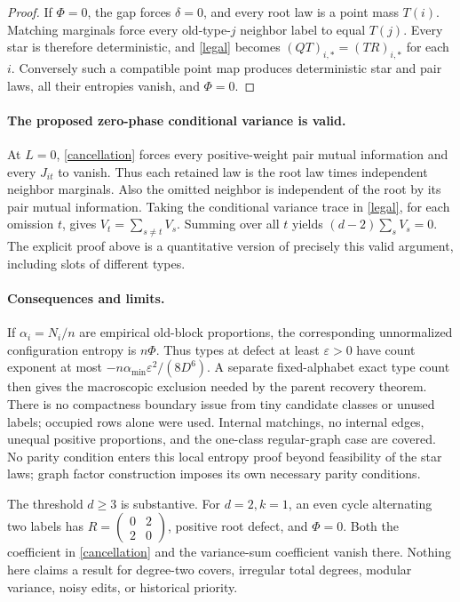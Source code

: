 \documentclass[11pt]{article}
\begin{document}
\begin{proof}
If $\Phi=0$, the gap forces $\delta=0$, and every root law is a point
mass $T(i)$. Matching marginals force every old-type-$j$ neighbor label
to equal $T(j)$. Every star is therefore deterministic, and
\eqref{legal} becomes $(QT)_{i,*}=(TR)_{i,*}$ for each $i$.
Conversely such a compatible point map produces deterministic star and
pair laws, all their entropies vanish, and $\Phi=0$.
\end{proof}

\paragraph{The proposed zero-phase conditional variance is valid.}
At $L=0$, \eqref{cancellation} forces every positive-weight pair mutual
information and every $J_{it}$ to vanish. Thus each retained law is the
root law times independent neighbor marginals. Also the omitted neighbor
is independent of the root by its pair mutual information. Taking the
conditional variance trace in \eqref{legal}, for each omission $t$,
gives $V_t=\sum_{s\ne t}V_s$. Summing over all $t$ yields
$(d-2)\sum_sV_s=0$. The explicit proof above is a quantitative version
of precisely this valid argument, including slots of different types.

\paragraph{Consequences and limits.}
If $\alpha_i=N_i/n$ are empirical old-block proportions, the corresponding
unnormalized configuration entropy is $n\Phi$. Thus types at defect at
least $\varepsilon>0$ have count exponent at most
$-n\alpha_{\min}\varepsilon^2/(8D^6)$. A separate fixed-alphabet exact
type count then gives the macroscopic exclusion needed by the parent
recovery theorem. There is no compactness boundary issue from tiny
candidate classes or unused labels; occupied rows alone were used.
Internal matchings, no internal edges, unequal positive proportions, and
the one-class regular-graph case are covered. No parity condition enters
this local entropy proof beyond feasibility of the star laws; graph
factor construction imposes its own necessary parity conditions.

The threshold $d\geq3$ is substantive. For $d=2,k=1$, an even cycle
alternating two labels has $R=\left(\begin{smallmatrix}0&2\\2&0\end{smallmatrix}\right)$,
positive root defect, and $\Phi=0$. Both the coefficient in
\eqref{cancellation} and the variance-sum coefficient vanish there.
Nothing here claims a result for degree-two covers, irregular total
degrees, modular variance, noisy edits, or historical priority.
\end{document}
